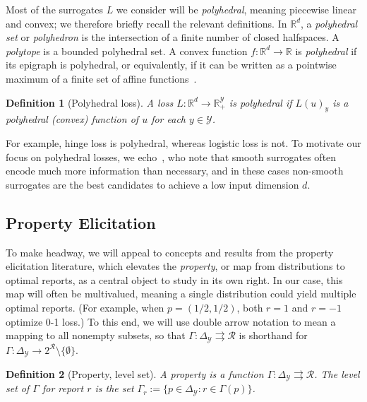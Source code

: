 \documentclass[11pt]{article}
\newcommand{\reals}{\mathbb{R}}
\newcommand{\simplex}{\Delta_\Y}
\newcommand{\R}{\mathcal{R}}
\newcommand{\Y}{\mathcal{Y}}
\newcommand{\toto}{\rightrightarrows}
\newtheorem{definition}{Definition}
\begin{document}
Most of the surrogates $L$ we consider will be \emph{polyhedral}, meaning piecewise linear and convex; we therefore briefly recall the relevant definitions.
In $\reals^d$, a \emph{polyhedral set} or \emph{polyhedron} is the intersection of a finite number of closed halfspaces.
A \emph{polytope} is a bounded polyhedral set.
A convex function $f:\reals^d\to\reals$ is \emph{polyhedral} if its epigraph is polyhedral, or equivalently, if it can be written as a pointwise maximum of a finite set of affine functions~\citep{rockafellar1997convex}.
%
\begin{definition}[Polyhedral loss]
  A loss $L: \reals^d \to \reals^{\Y}_+$ is \emph{polyhedral} if $L(u)_y$ is a polyhedral (convex) function of $u$ for each $y\in\Y$.
\end{definition}
%
For example, hinge loss is polyhedral, whereas logistic loss is not.
To motivate our focus on polyhedral losses, we echo~\citet[Section~1.2]{ramaswamy2018consistent}, who note that smooth surrogates often encode much more information than necessary, and in these cases non-smooth surrogates are the best candidates to achieve a low input dimension $d$.

\subsection{Property Elicitation}
\label{sec:property-elicitation}

To make headway, we will appeal to concepts and results from the property elicitation literature, which elevates the \emph{property}, or map from distributions to optimal reports, as a central object to study in its own right.
In our case, this map will often be multivalued, meaning a single distribution could yield multiple optimal reports.
(For example, when $p=(1/2,1/2)$, both $r=1$ and $r=-1$ optimize 0-1 loss.)
To this end, we will use double arrow notation to mean a mapping to all nonempty subsets, so that $\Gamma: \simplex \toto \R$ is shorthand for $\Gamma: \simplex \to 2^{\R} \setminus \{\emptyset\}$.

\begin{definition}[Property, level set]\label{def:property}
  A \emph{property} is a function $\Gamma:\simplex\toto\R$.
  The \emph{level set} of $\Gamma$ for report $r$ is the set $\Gamma_r := \{p \in \simplex : r \in \Gamma(p)\}$.
\end{definition}
\end{document}
